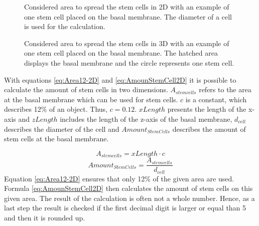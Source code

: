 \begin{figure}[ht]
\begin{center}
\caption[Considered area to spread the stem cells in two dimensions]{Considered area to spread the stem cells in 2D with an example of one stem cell placed on the basal membrane. The diameter of a cell is used for the calculation.}
\label{tikz:AreaIn2D}
\end{center}
\end{figure}


\begin{figure}[ht]
\begin{center}
\caption[Considered area to spread the stem cells in three dimensions]{Considered area to spread the stem cells in 3D with an example of one stem cell placed on the basal membrane. The hatched area displays the basal membrane and the circle represents one stem cell.}
\label{tikz:AreaIn3D}
\end{center}
\end{figure}


With equations \ref{eq:Area12-2D} and \ref{eq:AmounStemCell2D} it is possible to calculate the amount of stem cells in two dimensions. $A_{stem cells}$ refers to the area at the basal membrane which can be used for stem cells. $c$ is a constant, which describes 12\% of an object. Thus, $c=0.12$. $xLength$ presents the length of the x-axis and $zLength$ includes the length of the z-axis of the basal membrane, $d_{cell}$ describes the diameter of the cell and $Amount_{StemCells}$ describes the amount of stem cells at the basal membrane.

\begin{equation}\label{eq:Area12-2D}
A_{stem cells} = xLength \cdot c
\end{equation}
\begin{equation}\label{eq:AmounStemCell2D}
Amount_{StemCells} = \dfrac{A_{stem cells}}{d_{cell}} 
\end{equation}
Equation \ref{eq:Area12-2D} ensures that only 12\% of the given area are used. Formula \ref{eq:AmounStemCell2D} then calculates the amount of stem cells on this given area. The result of the calculation is often not a whole number. Hence, as a last step the result is checked if the first decimal digit is larger or equal than 5 and then it is rounded up.



